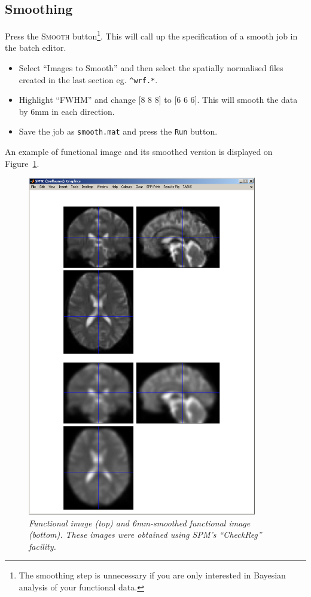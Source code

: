 \subsection{Smoothing}

Press the \textsc{Smooth} button\footnote{The smoothing step is unnecessary if you are only interested in Bayesian analysis of your functional data.}. This will call up the specification of a smooth job in the batch editor.

\begin{itemize}
\item Select ``Images to Smooth'' and then select the spatially normalised files created in the last section eg. \texttt{\textasciicircum wrf.*}.
\item Highlight ``FWHM'' and change [8 8 8] to [6 6 6]. This will smooth the data by 6mm in each direction.
\item Save the job as \texttt{smooth.mat} and press the \texttt{Run} button.
\end{itemize}

An example of functional image and its smoothed version is displayed on Figure~\ref{aud_smooth}.

\begin{figure}
\begin{center}
\includegraphics[width=100mm]{auditory/smooth}
\caption{\em Functional image (top) and 6mm-smoothed functional image (bottom). These images were obtained using SPM's ``CheckReg'' facility. \label{aud_smooth}}
\end{center}
\end{figure}


